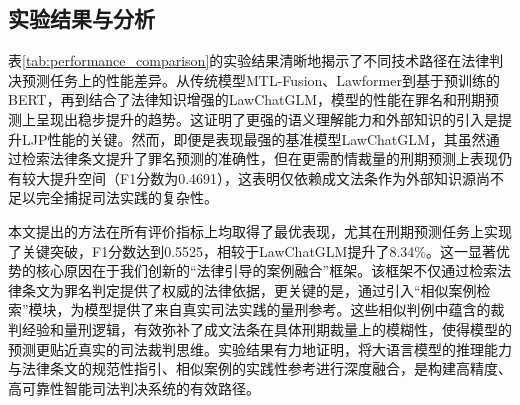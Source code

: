 \subsection{\heiti 实验结果与分析}


表\ref{tab:performance_comparison}的实验结果清晰地揭示了不同技术路径在法律判决预测任务上的性能差异。从传统模型MTL-Fusion、Lawformer到基于预训练的BERT，再到结合了法律知识增强的LawChatGLM，模型的性能在罪名和刑期预测上呈现出稳步提升的趋势。这证明了更强的语义理解能力和外部知识的引入是提升LJP性能的关键。然而，即便是表现最强的基准模型LawChatGLM，其虽然通过检索法律条文提升了罪名预测的准确性，但在更需酌情裁量的刑期预测上表现仍有较大提升空间（F1分数为0.4691），这表明仅依赖成文法条作为外部知识源尚不足以完全捕捉司法实践的复杂性。

本文提出的方法在所有评价指标上均取得了最优表现，尤其在刑期预测任务上实现了关键突破，F1分数达到0.5525，相较于LawChatGLM提升了8.34\%。这一显著优势的核心原因在于我们创新的“法律引导的案例融合”框架。该框架不仅通过检索法律条文为罪名判定提供了权威的法律依据，更关键的是，通过引入“相似案例检索”模块，为模型提供了来自真实司法实践的量刑参考。这些相似判例中蕴含的裁判经验和量刑逻辑，有效弥补了成文法条在具体刑期裁量上的模糊性，使得模型的预测更贴近真实的司法裁判思维。实验结果有力地证明，将大语言模型的推理能力与法律条文的规范性指引、相似案例的实践性参考进行深度融合，是构建高精度、高可靠性智能司法判决系统的有效路径。

